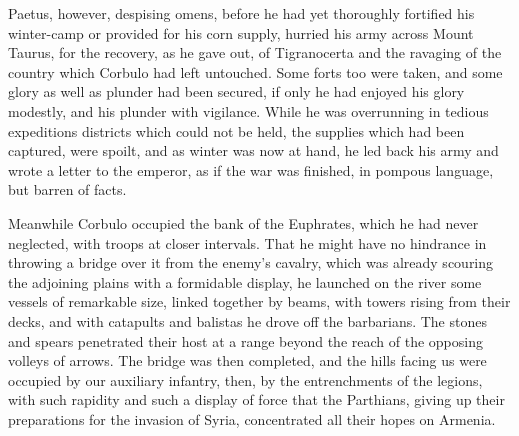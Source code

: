 
Paetus, however, despising omens, before he had yet thoroughly fortified his winter-camp or provided for his corn supply, hurried his army across Mount Taurus, for the recovery, as he gave out, of Tigranocerta and the ravaging of the country which Corbulo had left untouched. Some forts too were taken, and some glory as well as plunder had been secured, if only he had enjoyed his glory modestly, and his plunder with vigilance. While he was overrunning in tedious expeditions districts which could not be held, the supplies which had been captured, were spoilt, and as winter was now at hand, he led back his army and wrote a letter to the emperor, as if the war was finished, in pompous language, but barren of facts.


Meanwhile Corbulo occupied the bank of the Euphrates, which he had never neglected, with troops at closer intervals. That he might have no hindrance in throwing a bridge over it from the enemy's cavalry, which was already scouring the adjoining plains with a formidable display, he launched on the river some vessels of remarkable size, linked together by beams, with towers rising from their decks, and with catapults and balistas he drove off the barbarians. The stones and spears penetrated their host at a range beyond the reach of the opposing volleys of arrows. The bridge was then completed, and the hills facing us were occupied by our auxiliary infantry, then, by the entrenchments of the legions, with such rapidity and such a display of force that the Parthians, giving up their preparations for the invasion of Syria, concentrated all their hopes on Armenia.


